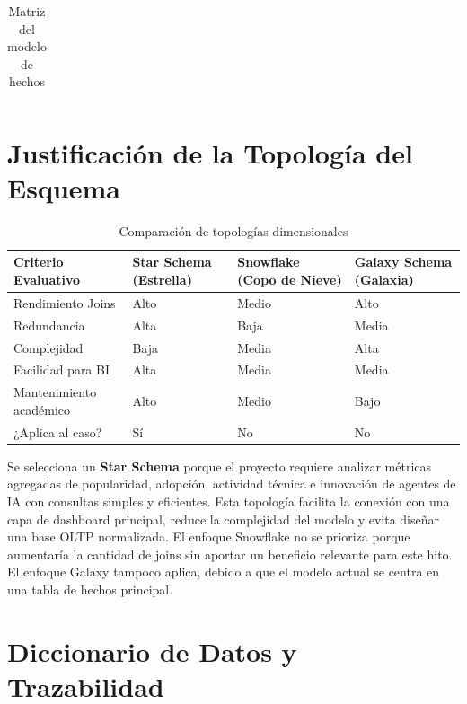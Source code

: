 \documentclass[12pt,a4paper]{article}
\begin{document}
\begin{longtable}{|P{3.2cm}|P{2.7cm}|P{7cm}|P{2.2cm}|}
\caption{Matriz del modelo de hechos}
\end{longtable}

\normalsize

\section{Justificación de la Topología del Esquema}

\begin{table}[H]
\centering
\small
{}
\begin{tabular}{|P{4cm}|P{3.4cm}|P{3.4cm}|P{3.4cm}|}
\hline
{}
\textbf{Criterio Evaluativo} & \textbf{Star Schema (Estrella)} & \textbf{Snowflake (Copo de Nieve)} & \textbf{Galaxy Schema (Galaxia)} \\ \hline
Rendimiento Joins & Alto & Medio & Alto \\ \hline
Redundancia & Alta & Baja & Media \\ \hline
Complejidad & Baja & Media & Alta \\ \hline
Facilidad para BI & Alta & Media & Media \\ \hline
Mantenimiento académico & Alto & Medio & Bajo \\ \hline
¿Aplica al caso? & Sí & No & No \\ \hline
\end{tabular}
\caption{Comparación de topologías dimensionales}
\end{table}

Se selecciona un \textbf{Star Schema} porque el proyecto requiere analizar métricas agregadas de popularidad, adopción, actividad técnica e innovación de agentes de IA con consultas simples y eficientes. Esta topología facilita la conexión con una capa de dashboard principal, reduce la complejidad del modelo y evita diseñar una base OLTP normalizada. El enfoque Snowflake no se prioriza porque aumentaría la cantidad de joins sin aportar un beneficio relevante para este hito. El enfoque Galaxy tampoco aplica, debido a que el modelo actual se centra en una tabla de hechos principal.

\section{Diccionario de Datos y Trazabilidad}
\end{document}
